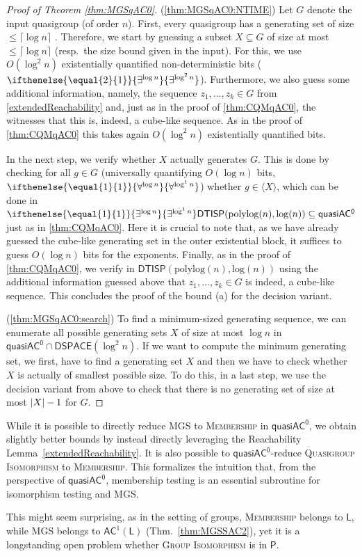 \documentclass{theoretics}
\newcommand{\algprobm}[1]{\textsc{#1}\xspace}
\newcommand{\betacc}[1]{\ifthenelse{\equal{#1}{1}}{\exists^{\log n}}{\exists^{\log^{#1}n}}} %
\newcommand{\alphacc}[1]{\ifthenelse{\equal{#1}{1}}{\forall^{\log n}}{\forall^{\log^{#1}n}}} %
\newcommand{\abs}[1]{\left|\mathinner{#1}\right|}
\newcommand{\Thm}[1]{Thm.~\ref{#1}\xspace}
\newcommand*{\ComplexityClass}[1]{\ensuremath{\mathsf{#1}}\xspace}
\newcommand{\DTISP}{\ComplexityClass{DTISP}}
\newcommand{\DTISPpll}{\ensuremath{\DTISP(\mathrm{polylog}(n),\mathrm{log}(n))}\xspace}
\newcommand*{\LogSpace}{\ComplexityClass{L}}
\newcommand{\qACz}{\ComplexityClass{quasiAC^0}}
\begin{document}
\begin{proof}[Proof of Theorem \ref{thm:MGSqAC0}]

(\ref{thm:MGSqAC0:NTIME}) Let $G$ denote the input quasigroup (of order $n$). First, every quasigroup has a generating set of size $\leq \lceil \log n \rceil$ \cite{MillerTarjan}. Therefore, we start by guessing a subset $X\subseteq G$ of size at most $\leq \lceil \log n \rceil$ (resp.\ the size bound given in the input). For this, we use $O(\log^2 n)$ existentially quantified non-deterministic bits ($\betacc{2}$). 
Furthermore, we also guess some additional information, namely, the sequence $z_1, \dots, z_k \in G$ from \cref{extendedReachability} and, just as in the proof of \cref{thm:CQMqAC0}, the witnesses that this is, indeed, a cube-like sequence. As in the proof of \cref{thm:CQMqAC0} this takes again $O(\log^2 n)$ existentially quantified bits.


 In the next step, we verify whether $X$ actually generates $G$. This is done by checking for all $g \in G$ (universally quantifying $O(\log n)$ bits, $\alphacc{1}$) whether $g \in \langle X \rangle$, which can be done in $\betacc{1}\DTISPpll \subseteq \qACz$ just as in \cref{thm:CQMqAC0}. 
 Here it is crucial to note that, as we have already guessed the cube-like generating set in the outer existential block, it suffices to guess $O(\log n)$ bits for the exponents. Finally, as in the proof of \cref{thm:CQMqAC0}, we verify in $\DTISPpll$ using the additional information guessed above that $z_1, \dots, z_k \in G$ is indeed, a cube-like sequence.
 This concludes the proof of the bound (a) for the decision variant. 

(\ref{thm:MGSqAC0:search})
To find a minimum-sized generating sequence,  we can enumerate all possible generating sets $X$ of size at most $\log n$ in $\qACz \cap \mathsf{DSPACE}(\log^2 n)$. 
If we want to compute the minimum generating set, we first, have to find a generating set $X$ and then we have to check whether $X$ is actually of smallest possible size. To do this, in a last step, we use the decision variant from above to check that there is no generating set of size at most $\abs{X} - 1$ for $G$.
\end{proof}

\begin{remark}
While it is possible to directly reduce \algprobm{MGS} to \algprobm{Membership} in $\qACz$, we obtain slightly better bounds by instead directly leveraging the Reachability Lemma~\ref{extendedReachability}. It is also possible to $\qACz$-reduce \algprobm{Quasigroup Isomorphism} to \algprobm{Membership}. This formalizes the intuition that, from the perspective of $\qACz$, membership testing is an essential subroutine for isomorphism testing and \algprobm{MGS}. 
 
This might seem surprising, as in the setting of groups, \algprobm{Membership} belongs to $\LogSpace$, while \algprobm{MGS} belongs to $\mathsf{AC}^{1}(\mathsf{L})$ (\Thm{thm:MGSSAC2}), yet it is a longstanding open problem whether \algprobm{Group Isomorphism} is in $\mathsf{P}$.   
\end{remark}
\end{document}

